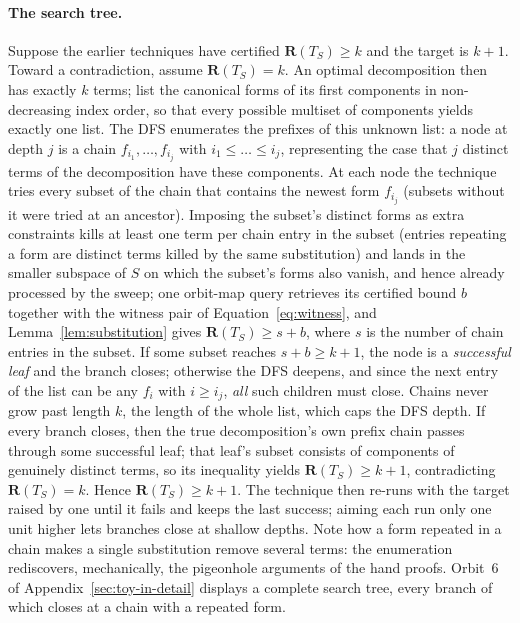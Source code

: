 \documentclass[11pt]{article}
\theoremstyle{definition}
\newcommand{\R}{\mathbf{R}}
\begin{document}
\paragraph{The search tree.} Suppose the earlier techniques have certified
$\R(T_S)\ge k$ and the target is $k+1$. Toward a contradiction, assume
$\R(T_S)=k$. An optimal decomposition then has exactly $k$
terms; list the canonical forms of its first components in non-decreasing index
order, so that every possible multiset of components yields exactly one list.
The DFS enumerates the prefixes of this unknown list: a node at
depth $j$ is a chain $f_{i_1},\dots,f_{i_j}$ with $i_1\le\dots\le i_j$,
representing the case that $j$ distinct terms of the decomposition have these
components. At each node the technique tries every subset of the chain that
contains the newest form $f_{i_j}$ (subsets without it were tried at an
ancestor). Imposing the subset's distinct forms as extra constraints kills at
least one term per chain entry in the subset (entries repeating a form are
distinct terms killed by the same substitution) and lands in the smaller subspace
of $S$ on which the subset's forms also vanish, and
hence already processed by the sweep; one orbit-map query retrieves its certified bound $b$ together with
the witness pair of Equation~\eqref{eq:witness}, and
Lemma~\ref{lem:substitution} gives $\R(T_S)\ge s+b$, where $s$ is the number of
chain entries in the subset. If some subset reaches $s+b\ge k+1$, the node is a
\emph{successful leaf} and the branch closes; otherwise the DFS deepens, and
since the next entry of the list can be any $f_i$ with $i\ge i_j$, \emph{all}
such children must close. Chains never grow past length $k$, the length of the
whole list, which caps the DFS depth. If every branch closes, then the true
decomposition's own prefix chain passes through some successful leaf; that leaf's
subset consists of components of genuinely distinct terms, so its inequality
yields $\R(T_S)\ge k+1$, contradicting $\R(T_S)=k$. Hence $\R(T_S)\ge k+1$. The
technique then re-runs with the target raised by one until it fails and keeps the
last success; aiming each run only one unit higher lets branches close at shallow
depths. Note how a form repeated in a chain makes a single substitution remove
several terms: the enumeration rediscovers, mechanically, the pigeonhole
arguments of the hand proofs. Orbit~6 of Appendix~\ref{sec:toy-in-detail}
displays a complete search tree, every branch of which closes at a chain with a
repeated form.
\end{document}
